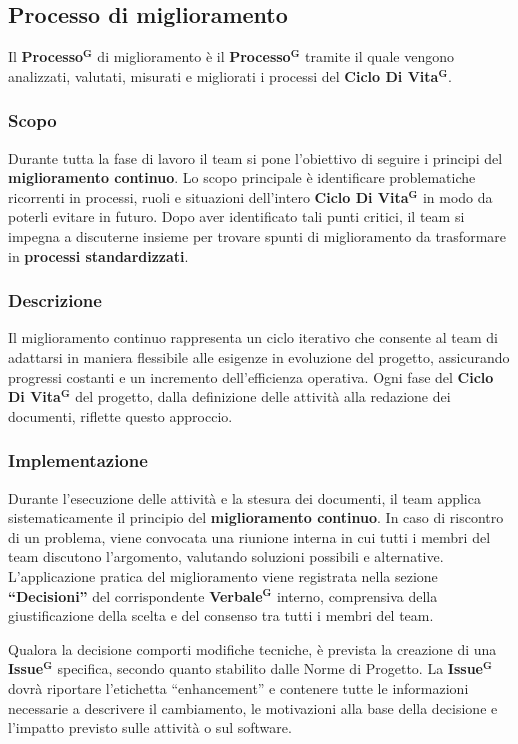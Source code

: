 \documentclass[a4paper,12pt]{article}
\newcommand{\term}[1]{\textbf{#1}$^\mathbf{G}$}
\begin{document}
\subsection{Processo di miglioramento} \label{sec:processo-miglioramento}
Il \term{Processo} di miglioramento è il \term{Processo} tramite il quale vengono analizzati, valutati, misurati e migliorati i processi del \term{Ciclo Di Vita}.

\subsubsection{Scopo}
Durante tutta la fase di lavoro il team si pone l'obiettivo di seguire i principi del \textbf{miglioramento continuo}. Lo scopo principale è identificare problematiche ricorrenti in processi, ruoli e situazioni dell'intero \term{Ciclo Di Vita} in modo da poterli evitare in futuro. Dopo aver identificato tali punti critici, il team si impegna a discuterne insieme per trovare spunti di miglioramento da trasformare in \textbf{processi standardizzati}. 

\subsubsection{Descrizione}
Il miglioramento continuo rappresenta un ciclo iterativo che consente al team di adattarsi in maniera flessibile alle esigenze in evoluzione del progetto, assicurando progressi costanti e un incremento dell’efficienza operativa. Ogni fase del \term{Ciclo Di Vita} del progetto, dalla definizione delle attività alla redazione dei documenti, riflette questo approccio.

\subsubsection{Implementazione}
Durante l’esecuzione delle attività e la stesura dei documenti, il team applica sistematicamente il principio del \textbf{miglioramento continuo}. In caso di riscontro di un problema, viene convocata una riunione interna in cui tutti i membri del team discutono l’argomento, valutando soluzioni possibili e alternative. L’applicazione pratica del miglioramento viene registrata nella sezione \textbf{“Decisioni”} del corrispondente \term{Verbale} interno, comprensiva della giustificazione della scelta e del consenso tra tutti i membri del team.

Qualora la decisione comporti modifiche tecniche, è prevista la creazione di una \term{Issue} specifica, secondo quanto stabilito dalle Norme di Progetto. La \term{Issue} dovrà riportare l’etichetta “enhancement” e contenere tutte le informazioni necessarie a descrivere il cambiamento, le motivazioni alla base della decisione e l’impatto previsto sulle attività o sul software.
\end{document}
